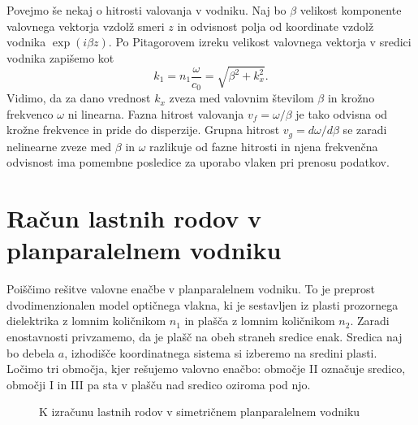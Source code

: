 Povejmo še nekaj o hitrosti valovanja v vodniku.
Naj bo $\beta$ velikost komponente valovnega vektorja vzdolž smeri $z$ in odvisnost 
polja od koordinate vzdolž vodnika $\exp (i\beta z)$. Po Pitagorovem izreku velikost
valovnega vektorja v sredici vodnika zapišemo kot
\begin{equation}
k_1 = n_{1}\frac{\omega}{c_0}=\sqrt{\beta^{2}+k_{x}^{2}}
\label{9.0}.
\end{equation}
Vidimo, da za dano vrednost $k_{x}$ zveza med valovnim številom $\beta$
in krožno frekvenco $\omega$ ni linearna. Fazna hitrost 
valovanja $v_{f}=\omega/\beta$ je tako
odvisna od krožne frekvence in pride do disperzije. Grupna 
hitrost $v_{g}=d\omega/d\beta$ 
se zaradi nelinearne zveze med $\beta$ in $\omega$ 
razlikuje od fazne hitrosti in njena frekvenčna odvisnost 
ima pomembne posledice za uporabo vlaken pri prenosu podatkov. 

\section{Račun lastnih rodov v planparalelnem vodniku}
Poiščimo rešitve valovne enačbe v planparalelnem vodniku. 
To je preprost dvodimenzionalen model optičnega vlakna, ki je sestavljen iz 
plasti prozornega dielektrika z lomnim količnikom $n_1$ in plašča z lomnim količnikom $n_2$.
Zaradi enostavnosti privzamemo, da je plašč na obeh straneh sredice enak.
Sredica naj bo debela $a$, izhodišče koordinatnega sistema
si izberemo na sredini plasti. Ločimo tri območja, kjer rešujemo valovno enačbo:
območje II označuje sredico, območji I in III pa sta v plašču nad sredico oziroma pod njo. 

\begin{figure}[h]
\centering
\def\svgwidth{120truemm} 

\caption{K izračunu lastnih rodov v simetričnem planparalelnem vodniku}
\label{fig:vodnikracun}
\end{figure}

